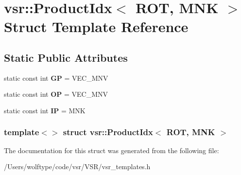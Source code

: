 \hypertarget{structvsr_1_1_product_idx_3_01_r_o_t_00_01_m_n_k_01_4}{\section{vsr\-:\-:Product\-Idx$<$ R\-O\-T, M\-N\-K $>$ Struct Template Reference}
\label{structvsr_1_1_product_idx_3_01_r_o_t_00_01_m_n_k_01_4}
}
\subsection*{Static Public Attributes}
\begin{DoxyCompactItemize}
\item 
\hypertarget{structvsr_1_1_product_idx_3_01_r_o_t_00_01_m_n_k_01_4_a3180634b2c7d327b57fa532e30d78310}{static const int {\bfseries G\-P} = V\-E\-C\-\_\-\-M\-N\-V}\label{structvsr_1_1_product_idx_3_01_r_o_t_00_01_m_n_k_01_4_a3180634b2c7d327b57fa532e30d78310}

\item 
\hypertarget{structvsr_1_1_product_idx_3_01_r_o_t_00_01_m_n_k_01_4_aeffd5d9aa133e0d472ea274725aab97b}{static const int {\bfseries O\-P} = V\-E\-C\-\_\-\-M\-N\-V}\label{structvsr_1_1_product_idx_3_01_r_o_t_00_01_m_n_k_01_4_aeffd5d9aa133e0d472ea274725aab97b}

\item 
\hypertarget{structvsr_1_1_product_idx_3_01_r_o_t_00_01_m_n_k_01_4_a7c9b78d8564278472bf8889f5cc0cc18}{static const int {\bfseries I\-P} = M\-N\-K}\label{structvsr_1_1_product_idx_3_01_r_o_t_00_01_m_n_k_01_4_a7c9b78d8564278472bf8889f5cc0cc18}

\end{DoxyCompactItemize}
\subsubsection*{template$<$$>$ struct vsr\-::\-Product\-Idx$<$ R\-O\-T, M\-N\-K $>$}



The documentation for this struct was generated from the following file\-:\begin{DoxyCompactItemize}
\item 
/\-Users/wolftype/code/vsr/\-V\-S\-R/vsr\-\_\-templates.\-h\end{DoxyCompactItemize}
